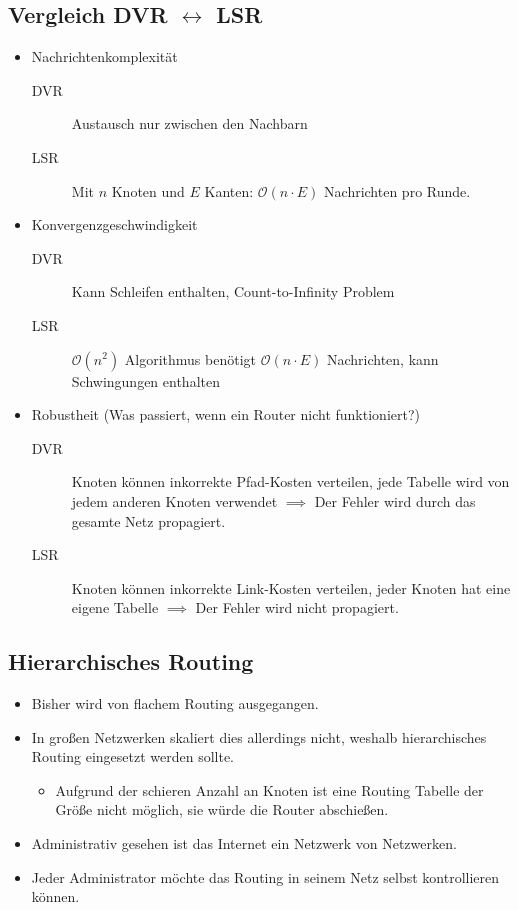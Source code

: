 		\subsection{Vergleich DVR \(\leftrightarrow\) LSR}
			\begin{itemize}
				\item Nachrichtenkomplexität
					\begin{description}
						\item[DVR] Austausch nur zwischen den Nachbarn
						\item[LSR] Mit \(n\) Knoten und \(E\) Kanten: \(\mathcal{O}(n \cdot E)\) Nachrichten pro Runde.
					\end{description}
				\item Konvergenzgeschwindigkeit
					\begin{description}
						\item[DVR] Kann Schleifen enthalten, Count-to-Infinity Problem
						\item[LSR] \(\mathcal{O}(n^2)\) Algorithmus benötigt \(\mathcal{O}(n \cdot E)\) Nachrichten, kann Schwingungen enthalten
					\end{description}
				\item Robustheit (Was passiert, wenn ein Router nicht funktioniert?)
					\begin{description}
						\item[DVR] Knoten können inkorrekte Pfad-Kosten verteilen, jede Tabelle wird von jedem anderen Knoten verwendet \(\implies\) Der Fehler wird durch das gesamte Netz propagiert.
						\item[LSR] Knoten können inkorrekte Link-Kosten verteilen, jeder Knoten hat eine eigene Tabelle \(\implies\) Der Fehler wird nicht propagiert.
					\end{description}
			\end{itemize}

		\subsection{Hierarchisches Routing}
			\begin{itemize}
				\item Bisher wird von flachem Routing ausgegangen.
				\item In großen Netzwerken skaliert dies allerdings nicht, weshalb hierarchisches Routing eingesetzt werden sollte.
					\begin{itemize}
						\item Aufgrund der schieren Anzahl an Knoten ist eine Routing Tabelle der Größe nicht möglich, sie würde die Router abschießen.
					\end{itemize}
				\item Administrativ gesehen ist das Internet ein Netzwerk von Netzwerken.
				\item Jeder Administrator möchte das Routing in seinem Netz selbst kontrollieren können.
			\end{itemize}


